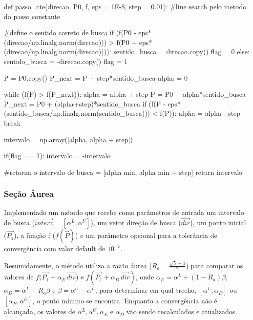 \documentclass[10pt, a4paper]{article}
\begin{document}
\begin{python}
  def passo_cte(direcao, P0, f, eps = 1E-8, step = 0.01):
    #line search pelo metodo do passo constante
      
    #define o sentido correto de busca
    if (f(P0 - eps*(direcao/np.linalg.norm(direcao))) > f(P0 + eps*(direcao/np.linalg.norm(direcao)))):
        sentido_busca = direcao.copy()
        flag = 0
    else:
        sentido_busca = -direcao.copy()
        flag = 1
        
    P = P0.copy()
    P_next = P + step*sentido_busca
    alpha = 0
   
    while (f(P) > f(P_next)):           
        alpha = alpha + step
        P = P0 + alpha*sentido_busca
        P_next = P0 + (alpha+step)*sentido_busca
        if (f(P - eps*(sentido_busca/np.linalg.norm(sentido_busca))) < f(P)):
            alpha = alpha - step
            break
    
    intervalo = np.array([alpha, alpha + step])
    
    if(flag == 1):
        intervalo = -intervalo
        
    #retorna o intervalo de busca = [alpha min, alpha min + step]                 
    return intervalo
\end{python}

\subsubsection{Seção Áurea}

Implementado um método que recebe como parâmetros de entrada um intervalo de busca
($\overrightarrow{interv} = [\alpha^L, \alpha^U]$), um vetor direção de busca ($\overrightarrow{dir}$), um ponto inicial ($\overrightarrow{P_1}$), a função f ($f(\overrightarrow{P})$) 
e um parâmetro opcional para a tolerância de convergência com valor default de $10^{-5}$.

Resumidamente, o método utiliza a razão áurea ($R_a = \frac{\sqrt{5} - 1}{2}$) para comparar os 
valores de $f(\overrightarrow{P_1} + \alpha_{E}\,\overrightarrow{dir}$) e $f(\overrightarrow{P_1} + \alpha_{D}\,\overrightarrow{dir})$,
onde $\alpha_{E} = \alpha^L + (1 - R_a )\beta$, $\alpha_{D} = \alpha^L + R_a\beta$ e $\beta = \alpha^U - \alpha^L$, 
para determinar em qual trecho, $[\alpha^L, \alpha_{D}]$ ou $[\alpha_{E}, \alpha^U]$, o ponto mínimo se encontra. Enquanto a
convergência não é alcançada, os valores de $\alpha^L, \alpha^U, \alpha_E$ e $\alpha_D$ vão sendo recalculados e atualizados.
\end{document}
